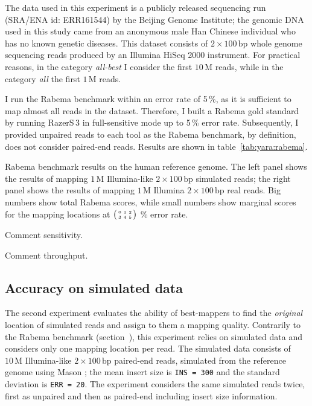 The data used in this experiment is a publicly released sequencing run (SRA/ENA id: ERR161544) by the Beijing Genome Institute;
the genomic DNA used in this study came from an anonymous male Han Chinese individual who has no known genetic diseases.
This dataset consists of $2 \times 100\,\text{bp}$ whole genome sequencing reads produced by an Illumina HiSeq 2000 instrument.
For practical reasons, in the category \emph{all-best} I consider the first $10\,\text{M}$ reads, while in the category \emph{all} the first $1\,\text{M}$ reads.

I run the Rabema benchmark within an error rate of 5\,\%, as it is sufficient to map almost all reads in the dataset.
Therefore, I built a Rabema gold standard by running RazerS\,3 in full-sensitive mode up to 5\,\% error rate.
Subsequently, I provided unpaired reads to each tool as the Rabema benchmark, by definition, does not consider paired-end reads.
Results are shown in table~\ref{tab:yara:rabema}.

\begin{table*}[t]
  \caption[Yara results in the Rabema benchmark]
  {
  \label{tab:yara:rabema}
    Rabema benchmark results on the human reference genome.
    The left panel shows the results of mapping $1\,\text{M}$ Illumina-like $2 \times 100\,\text{bp}$ simulated reads; the right panel shows the results of mapping $1\,\text{M}$ Illumina $2 \times 100\,\text{bp}$ real reads.
    Big numbers show total Rabema scores, while small numbers show marginal scores for the mapping locations at
    $\bigl(\begin{smallmatrix}\mbox{\tiny 0}&\mbox{\tiny 1}&\mbox{\tiny 2}\\\mbox{\tiny 3}&\mbox{\tiny 4}&\mbox{\tiny 5}\end{smallmatrix}\bigr)$ \% error rate.
    }
  \vspace{-3mm}
  \center
  \sffamily
  \resizebox{0.95\textwidth}{!}
  {
	\renewcommand{\tabcolsep}{0.8ex}
	
  }
\end{table*}


Comment sensitivity.

Comment throughput.

\subsection{Accuracy on simulated data}

The second experiment evaluates the ability of best-mappers to find the \emph{original} location of simulated reads and assign to them a mapping quality.
Contrarily to the Rabema benchmark (section~\label{sec:yara:evaluation:rabema}), this experiment relies on simulated data and considers only one mapping location per read.
The simulated data consists of $10\,\text{M}$ Illumina-like $2 \times 100\,\text{bp}$ paired-end reads, simulated from the reference genome using Mason \citep{Holtgrewe2010}; the mean insert size is \texttt{INS = 300} and the standard deviation is \texttt{ERR = 20}.
The experiment considers the same simulated reads twice, first as unpaired and then as paired-end including insert size information.

